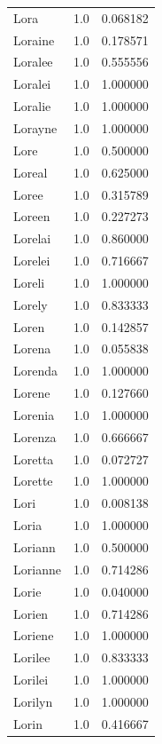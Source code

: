 \documentclass[
  letterpaper,
  DIV=11,
  numbers=noendperiod]{scrreprt}
\begin{document}
\begin{tabular}{lrr}
Lora            &   1.0 &   0.068182 \\
Loraine         &   1.0 &   0.178571 \\
Loralee         &   1.0 &   0.555556 \\
Loralei         &   1.0 &   1.000000 \\
Loralie         &   1.0 &   1.000000 \\
Lorayne         &   1.0 &   1.000000 \\
Lore            &   1.0 &   0.500000 \\
Loreal          &   1.0 &   0.625000 \\
Loree           &   1.0 &   0.315789 \\
Loreen          &   1.0 &   0.227273 \\
Lorelai         &   1.0 &   0.860000 \\
Lorelei         &   1.0 &   0.716667 \\
Loreli          &   1.0 &   1.000000 \\
Lorely          &   1.0 &   0.833333 \\
Loren           &   1.0 &   0.142857 \\
Lorena          &   1.0 &   0.055838 \\
Lorenda         &   1.0 &   1.000000 \\
Lorene          &   1.0 &   0.127660 \\
Lorenia         &   1.0 &   1.000000 \\
Lorenza         &   1.0 &   0.666667 \\
Loretta         &   1.0 &   0.072727 \\
Lorette         &   1.0 &   1.000000 \\
Lori            &   1.0 &   0.008138 \\
Loria           &   1.0 &   1.000000 \\
Loriann         &   1.0 &   0.500000 \\
Lorianne        &   1.0 &   0.714286 \\
Lorie           &   1.0 &   0.040000 \\
Lorien          &   1.0 &   0.714286 \\
Loriene         &   1.0 &   1.000000 \\
Lorilee         &   1.0 &   0.833333 \\
Lorilei         &   1.0 &   1.000000 \\
Lorilyn         &   1.0 &   1.000000 \\
Lorin           &   1.0 &   0.416667 \\

\end{tabular}
\end{document}
